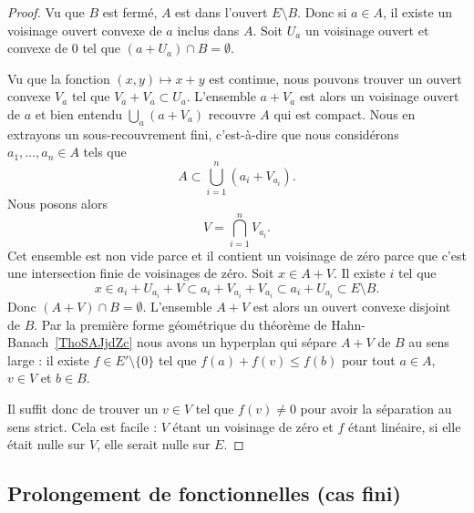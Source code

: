 	\begin{proof}
		Vu que \( B\) est fermé, \( A\) est dans l'ouvert \( E\setminus B\). Donc si \( a\in A\), il existe un voisinage ouvert convexe de \( a\) inclus dans \( A\). Soit \( U_a\) un voisinage ouvert et convexe de \( 0\) tel que \( (a+U_a)\cap B=\emptyset\).

		Vu que la fonction \( (x,y)\mapsto x+y\) est continue, nous pouvons trouver un ouvert convexe \( V_a\) tel que \( V_a+V_a\subset U_a\). L'ensemble \( a+V_a\) est alors un voisinage ouvert de \( a\) et bien entendu \( \bigcup_a(a+V_a)\) recouvre \( A\) qui est compact. Nous en extrayons un sous-recouvrement fini, c'est-à-dire que nous considérons \( a_1,\ldots, a_n\in A\) tels que
		\begin{equation}
			A\subset \bigcup_{i=1}^n(a_i+V_{a_i}).
		\end{equation}
		Nous posons alors
		\begin{equation}
			V=\bigcap_{i=1}^nV_{a_i}.
		\end{equation}
		Cet ensemble est non vide parce et il contient un voisinage de zéro parce que c'est une intersection finie de voisinages de zéro. Soit \( x\in A+V\). Il existe \( i\) tel que
		\begin{equation}
			x\in a_i+U_{a_i}+V\subset a_i+V_{a_i}+V_{a_i}\subset a_i+U_{a_i}\subset E\setminus B.
		\end{equation}
		Donc \( (A+V)\cap B=\emptyset\). L'ensemble \( A+V\) est alors un ouvert convexe disjoint de \( B\). Par la première forme géométrique du théorème de Hahn-Banach~\ref{ThoSAJjdZc} nous avons un hyperplan qui sépare \( A+V\) de \( B\) au sens large : il existe \( f\in E'\setminus\{ 0 \}\) tel que \( f(a)+f(v)\leq f(b)\) pour tout \( a\in A\), \( v\in V\) et \( b\in B\).

		Il suffit donc de trouver un \( v\in V\) tel que \( f(v)\neq 0\) pour avoir la séparation au sens strict. Cela est facile : \( V\) étant un voisinage de zéro et \( f\) étant linéaire, si elle était nulle sur \( V\), elle serait nulle sur \( E\).
	\end{proof}

	\subsection{Prolongement de fonctionnelles (cas fini)}

